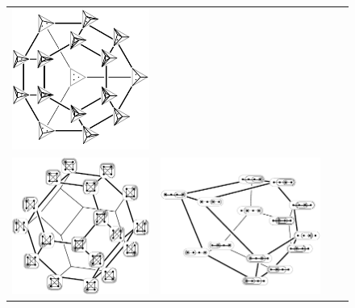 \documentclass{amsart}
\theoremstyle{definition}
\begin{document}
\begin{figure}[t]
{\begin{tabular}{c@{\;}c@{\;}c@{\;}c}
    		\includegraphics[scale=.6]{stellohedron} \\
    		\includegraphics[scale=.6]{permutahedronTubings} &
    		\includegraphics[scale=.6]{associahedronTubings} &

\end{tabular}}
\end{figure}
\end{document}
